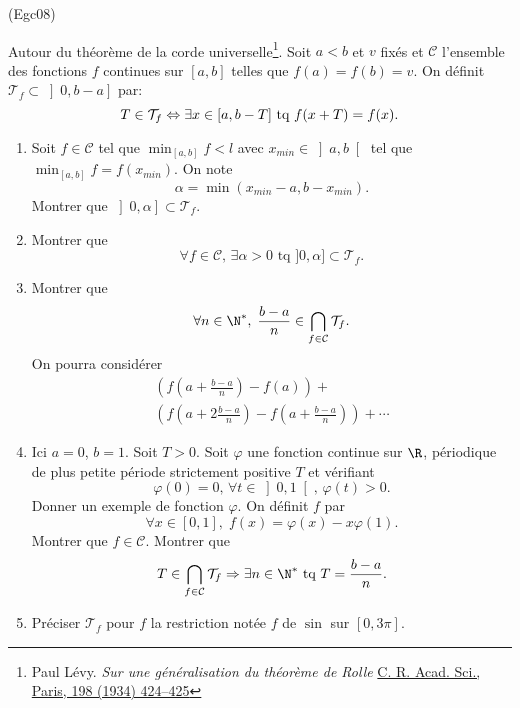 \begin{tiny}(Egc08)\end{tiny} Autour du théorème de la corde universelle\footnote{Paul Lévy. \emph{Sur une généralisation du théorème de Rolle}  \href{https://gallica.bnf.fr/ark:/12148/bpt6k31506/f424/}{C. R. Acad. Sci., Paris, 198 (1934) 424–425}}.\newline
Soit $a<b$ et $v$ fixés et $\mathcal{C}$ l'ensemble des fonctions $f$ continues sur $[a,b]$ telles que $f(a)=f(b) = v$.\newline
On définit $\mathcal{T}_f \subset \left]0,b-a\right]$ par:
\begin{displaymath}
T\in \mathcal{T}_f \Leftrightarrow \exists x \in [a,b-T] \\ \text{ tq } f(x+T) = f(x).
\end{displaymath}
\begin{enumerate}
  \item Soit $f\in \mathcal{C}$ tel que $\min_{[a,b]}f < l$ avec $x_{min}\in \left]a,b\right[$ tel que $\min_{[a,b]}f = f(x_{min})$. On note
\begin{displaymath}
  \alpha = \min(x_{min}-a, b-x_{min}).
\end{displaymath}
Montrer que $\left] 0, \alpha \right] \subset \mathcal{T}_f$.

\item Montrer que
\[
 \forall f\in \mathcal{C},\, \exists \alpha >0 \text{ tq } ]0,\alpha]\subset \mathcal{T}_f.
\]

\item Montrer que 
\[
  \forall n \in \N^*,\; \frac{b-a}{n} \in \bigcap_{f \in \mathcal{C}} \mathcal{T}_f .
\]
On pourra considérer
\begin{multline*}
\left( f(a+\frac{b-a}{n})-f(a)\right) +\\
\left( f(a+2\frac{b-a}{n})-f(a+\frac{b-a}{n})\right) +\cdots 
\end{multline*}

  \item Ici $a=0$, $b=1$. Soit $T >0$. Soit $\varphi$ une fonction continue sur $\R$, périodique de plus petite période strictement positive $T$ et vérifiant
\[
  \varphi(0) = 0, \, \forall t \in \left] 0,1 \right[, \, \varphi(t) >0.
\]
Donner un exemple de fonction $\varphi$. 
On définit $f$ par 
\[
  \forall x \in \left[0,1\right],\; f(x) = \varphi(x) - x\varphi(1).
\]
Montrer que $f \in \mathcal{C}$. 
Montrer que
\[
T \in \bigcap_{f \in \mathcal{C}} \mathcal{T}_f \Rightarrow \exists n \in \N^* \text{ tq } T = \frac{b-a}{n}.
\]

  \item Préciser $\mathcal{T}_f$ pour $f$ la restriction notée $f$ de $\sin$ sur $[0,3\pi]$.

\end{enumerate}

